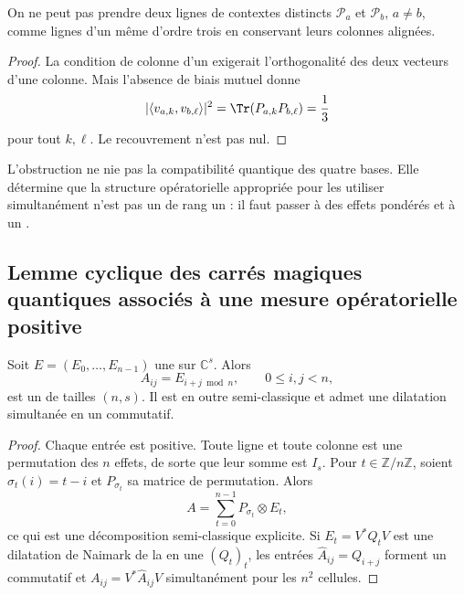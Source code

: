 \begin{proposition}
\label{p12-83-c22-s3:gmc:prop:no-go-mub}
On ne peut pas prendre deux lignes de contextes distincts
$\mathcal P_a$ et $\mathcal P_b$, $a\ne b$, comme lignes d'un même \QLS
d'ordre trois en conservant leurs colonnes alignées.
\end{proposition}

\begin{proof}
La condition de colonne d'un \QLS exigerait l'orthogonalité des deux
vecteurs d'une colonne. Mais l'absence de biais mutuel donne
\[
 |\langle v_{a,k},v_{b,\ell}\rangle|^2
 =\Tr(P_{a,k}P_{b,\ell})=\frac13
\]
pour tout $k,\ell$. Le recouvrement n'est pas nul.
\end{proof}

L'obstruction ne nie pas la compatibilité quantique des quatre bases.
Elle détermine que la structure opératorielle appropriée pour les utiliser simultanément n'est pas un
\QLS de rang un : il faut passer à des effets pondérés et à un \QMS.

\subsection{Lemme cyclique des carrés magiques quantiques associés à une mesure opératorielle positive}

\begin{lemma}
\label{p12-83-c22-s3:gmc:lem:qms-ciclico}
Soit $E=(E_0,\ldots,E_{n-1})$ une \POVM sur $\mathbb C^s$. Alors
\[
 A_{ij}=E_{i+j\bmod n},
 \qquad 0\le i,j<n,
 \tag{GMC-4.3}
\]
est un \QMS de tailles $(n,s)$. Il est en outre semi-classique et admet une
dilatation simultanée en un \QPM commutatif.
\end{lemma}

\begin{proof}
Chaque entrée est positive. Toute ligne et toute colonne est une permutation des
$n$ effets, de sorte que leur somme est $I_s$. Pour $t\in\mathbb Z/n\mathbb Z$,
soient $\sigma_t(i)=t-i$ et $P_{\sigma_t}$ sa matrice de permutation. Alors
\[
 A=\sum_{t=0}^{n-1}P_{\sigma_t}\otimes E_t,
 \tag{GMC-4.4}
\]
ce qui est une décomposition semi-classique explicite. Si
$E_t=V^*Q_tV$ est une dilatation de Naimark de la \POVM en une \PVM
$(Q_t)_t$, les entrées
$\widehat A_{ij}=Q_{i+j}$ forment un \QPM commutatif et
$A_{ij}=V^*\widehat A_{ij}V$ simultanément pour les $n^2$ cellules.
\end{proof}

